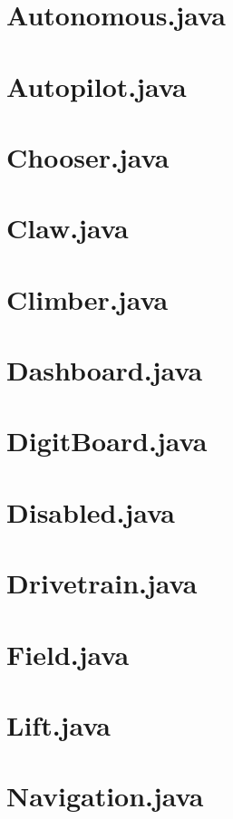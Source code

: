 \newpage\section*{Autonomous.java}
\newpage\section*{Autopilot.java}
\newpage\section*{Chooser.java}
\newpage\section*{Claw.java}
\newpage\section*{Climber.java}
\newpage\section*{Dashboard.java}
\newpage\section*{DigitBoard.java}
\newpage\section*{Disabled.java}
\newpage\section*{Drivetrain.java}
\newpage\section*{Field.java}
\newpage\section*{Lift.java}
\newpage\section*{Navigation.java}
